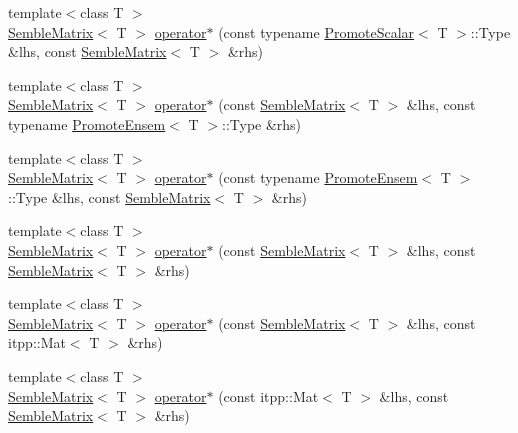 \begin{DoxyCompactItemize}
\item 
{\footnotesize template$<$class T $>$ }\\\mbox{\hyperlink{structSEMBLE_1_1SembleMatrix}{Semble\+Matrix}}$<$ T $>$ \mbox{\hyperlink{namespaceSEMBLE_a183fae303991bec98acb922d225f9897}{operator$\ast$}} (const typename \mbox{\hyperlink{structSEMBLE_1_1PromoteScalar}{Promote\+Scalar}}$<$ T $>$\+::Type \&lhs, const \mbox{\hyperlink{structSEMBLE_1_1SembleMatrix}{Semble\+Matrix}}$<$ T $>$ \&rhs)
\item 
{\footnotesize template$<$class T $>$ }\\\mbox{\hyperlink{structSEMBLE_1_1SembleMatrix}{Semble\+Matrix}}$<$ T $>$ \mbox{\hyperlink{namespaceSEMBLE_a1f882fb3141f6c185b31b62c5fe664e3}{operator$\ast$}} (const \mbox{\hyperlink{structSEMBLE_1_1SembleMatrix}{Semble\+Matrix}}$<$ T $>$ \&lhs, const typename \mbox{\hyperlink{structSEMBLE_1_1PromoteEnsem}{Promote\+Ensem}}$<$ T $>$\+::Type \&rhs)
\item 
{\footnotesize template$<$class T $>$ }\\\mbox{\hyperlink{structSEMBLE_1_1SembleMatrix}{Semble\+Matrix}}$<$ T $>$ \mbox{\hyperlink{namespaceSEMBLE_af9219234fb26a075ab129f4199f9da05}{operator$\ast$}} (const typename \mbox{\hyperlink{structSEMBLE_1_1PromoteEnsem}{Promote\+Ensem}}$<$ T $>$\+::Type \&lhs, const \mbox{\hyperlink{structSEMBLE_1_1SembleMatrix}{Semble\+Matrix}}$<$ T $>$ \&rhs)
\item 
{\footnotesize template$<$class T $>$ }\\\mbox{\hyperlink{structSEMBLE_1_1SembleMatrix}{Semble\+Matrix}}$<$ T $>$ \mbox{\hyperlink{namespaceSEMBLE_a4b0ae33797f704d614ed0a31b9bdf51a}{operator$\ast$}} (const \mbox{\hyperlink{structSEMBLE_1_1SembleMatrix}{Semble\+Matrix}}$<$ T $>$ \&lhs, const \mbox{\hyperlink{structSEMBLE_1_1SembleMatrix}{Semble\+Matrix}}$<$ T $>$ \&rhs)
\item 
{\footnotesize template$<$class T $>$ }\\\mbox{\hyperlink{structSEMBLE_1_1SembleMatrix}{Semble\+Matrix}}$<$ T $>$ \mbox{\hyperlink{namespaceSEMBLE_a43dcbbd3809fc622936a5edfd8a682a9}{operator$\ast$}} (const \mbox{\hyperlink{structSEMBLE_1_1SembleMatrix}{Semble\+Matrix}}$<$ T $>$ \&lhs, const itpp\+::\+Mat$<$ T $>$ \&rhs)
\item 
{\footnotesize template$<$class T $>$ }\\\mbox{\hyperlink{structSEMBLE_1_1SembleMatrix}{Semble\+Matrix}}$<$ T $>$ \mbox{\hyperlink{namespaceSEMBLE_aa848b76b110517db4feab23c8e83a941}{operator$\ast$}} (const itpp\+::\+Mat$<$ T $>$ \&lhs, const \mbox{\hyperlink{structSEMBLE_1_1SembleMatrix}{Semble\+Matrix}}$<$ T $>$ \&rhs)

\end{DoxyCompactItemize}
